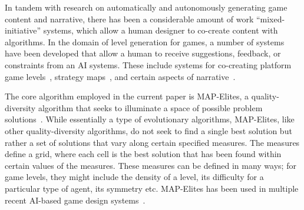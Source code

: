 
In tandem with research on automatically and autonomously generating game content and narrative, there has been a considerable amount of work ``mixed-initiative'' systems, which allow a human designer to co-create content with algorithms. In the domain of level generation for games, a number of systems have been developed that allow a human to receive suggestions, feedback, or constraints from an AI systems. These include systems for co-creating platform game levels~\cite{p11smith_tanagra_2011}, strategy maps~\cite{p11liapis_sentient_2013}, and certain aspects of narrative~\cite{p11kreminski_germinate_2020,kreminski_why_2020}.


The core algorithm employed in the current paper is MAP-Elites, a quality-diversity algorithm that seeks to illuminate a space of possible problem solutions~\cite{p11mouret_illuminating_2015}. While essentially a type of evolutionary algorithms, MAP-Elites, like other quality-diversity algorithms, do not seek to find a single best solution but rather a set of solutions that vary along certain specified measures. The measures define a grid, where each cell is the best solution that has been found within certain values of the measures. These measures can be defined in many ways; for game levels, they might include the density of a level, its difficulty for a particular type of agent, its symmetry etc. MAP-Elites has been used in multiple recent AI-based game design systems~\cite{p11alvarez_assessing_2021,alvarez_empowering_2019,charity_baba_2020,charity_mech-elites_2020,khalifa_talakat_2018}.